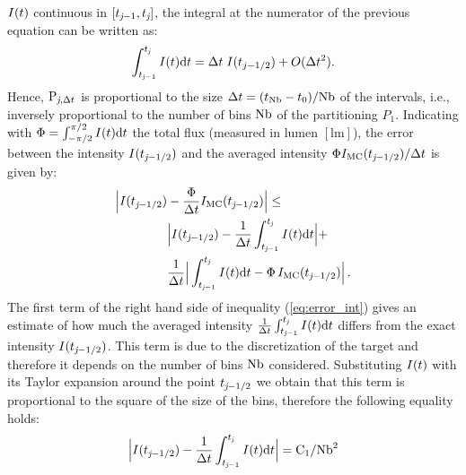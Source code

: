 $I(t)$ continuous in $[t_{\textit{j}-1}, t_{\textit{j}}]$, the integral at the numerator of the previous equation can be written as: \begin{equation}
\int_{t_{\textit{j}-1}}^{t_{\textit{j}}} I(t) \textrm{d}t = \Delta t\;I(t_{j-1/2}) + O(\Delta t^2).
\end{equation}
Hence, $\textrm{P}_{\textit{j}, \Delta t}$ is proportional to the size $\Delta t= (t_{\textrm{Nb}}-t_{0})/{\textrm{Nb}}$
of the intervals, i.e., inversely proportional to the number of bins $\textrm{Nb}$ of the partitioning $P_1$.
Indicating with $\Phi = \int_{-\pi/2}^{\pi/2}I(t) \textrm{d}t$ the total flux (measured in lumen $[\textrm{lm}]$),
the error between the intensity $I(t_{\textit{j}-1/2})$
 and the averaged  intensity $\Phi I_{\textrm{MC}}(t_{\textit{j}-1/2})/\Delta t$ is given by:
\begin{equation}\label{eq:error_int}
\begin{aligned}
\Big|I(t_{\textit{j}-1/2})&-\frac{\Phi}
{\Delta t}I_{\textrm{MC}}(t_{\textit{j}-1/2})\Big| \leq\\
 &\Big|I(t_{\textit{j}-1/2})-\frac{1}{\Delta t}\int_{t_{\textit{j}-1}}^{t_{\textit{j}}} I(t)\textrm{d}t\Big|+\\
&\frac{1}{\Delta t}\Big|\int_{t_{\textit{j}-1}}^{t_{\textit{j}}} I(t)\textrm{d}t-
\Phi\, I_{\textrm{MC}}(t_{\textit{j}-1/2})\Big| \,.
\end{aligned}
\end{equation}
\indent The first term of the right hand side of inequality (\ref{eq:error_int}) gives an estimate of how much the averaged intensity
 $\frac{1}{\Delta t}\int_{t_{\textit{j}-1}}^{t_{\textit{j}}} I(t)\textrm{d}t$ differs from the exact intensity $I(t_{\textit{j}-1/2})$.
This term is due to the discretization of the target and therefore it depends on the number of bins $\textrm{Nb}$ considered.
  Substituting $I(t)$ with its Taylor expansion around the point $t_{\textit{j}-1/2}$ we obtain that this term is proportional to the square of the size of the bins, therefore the following equality holds:
\begin{equation}\Big|I(t_{\textit{j}-1/2})-\frac{1}{\Delta t}\int_{t_{\textit{j}-1}}^{t_{\textit{j}}} I(t)\textrm{d}t\Big| = \textrm{C}_1/\textrm{Nb}^2\end{equation}
